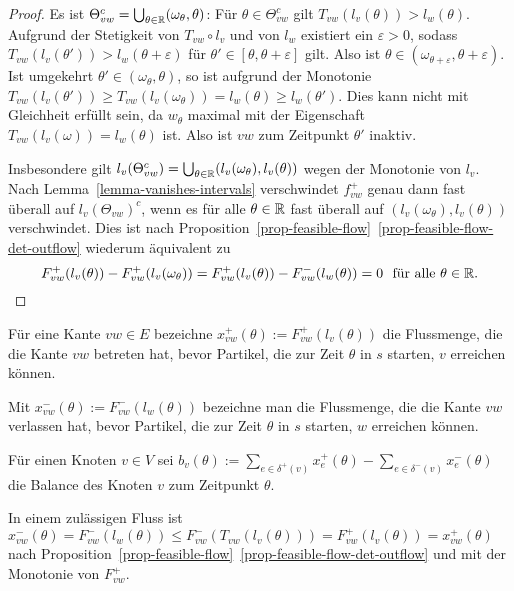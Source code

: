 \begin{proof}
	Es ist $\Theta_{vw}^c = \bigcup_{\theta\in\mathbb{R}} (\omega_\theta, \theta)$:
	Für $\theta\in\Theta_{vw}^c$ gilt $T_{vw}(l_v(\theta)) > l_w(\theta)$.
	Aufgrund der Stetigkeit von $T_{vw}\circ l_v$ und von $l_w$ existiert ein $\varepsilon>0$, sodass $T_{vw}(l_v(\theta')) > l_w(\theta+\varepsilon)$ für $\theta'\in[\theta,\theta+\varepsilon]$ gilt.
	Also ist $\theta\in(\omega_{\theta+\varepsilon}, \theta+\varepsilon)$.
	Ist umgekehrt $\theta'\in (\omega_\theta,\theta)$, so ist aufgrund der Monotonie $T_{vw}(l_v(\theta'))\geq T_{vw}(l_v(\omega_\theta)) = l_w(\theta)\geq l_w(\theta')$.
	Dies kann nicht mit Gleichheit erfüllt sein, da $w_\theta$ maximal mit der Eigenschaft $T_{vw}(l_v(\omega)) = l_w(\theta)$ ist.
	Also ist $vw$ zum Zeitpunkt $\theta'$ inaktiv.
	
	Insbesondere gilt $l_v(\Theta_{vw}^c) = \bigcup_{\theta\in\mathbb{R}}(l_v(\omega_\theta),l_v(\theta))$ wegen der Monotonie von $l_v$.
	Nach Lemma~\ref{lemma-vanishes-intervals} verschwindet $f_{vw}^+$ genau dann fast überall auf $l_v(\Theta_{vw})^c$, wenn es für alle $\theta\in\mathbb{R}$ fast überall auf $(l_v(\omega_\theta),l_v(\theta))$ verschwindet.
	Dies ist nach Proposition~\ref{prop-feasible-flow}~\ref{prop-feasible-flow-det-outflow} wiederum äquivalent zu
	$$F_{vw}^+(l_v(\theta))-F_{vw}^+(l_v(\omega_\theta)) = F_{vw}^+(l_v(\theta))-F_{vw}^-(l_w(\theta))=0~~\text{für alle $\theta\in\mathbb{R}$}.$$
	\vspace{-2.8 \baselineskip}
	
\end{proof}

\begin{definition}
	Für eine Kante $vw\in E$ bezeichne $x_{vw}^+(\theta):= F_{vw}^+(l_v(\theta))$ die Flussmenge, die die Kante $vw$ betreten hat, bevor Partikel, die zur Zeit $\theta$ in $s$ starten, $v$ erreichen können.
	
	Mit $x_{vw}^-(\theta):= F^-_{vw}(l_w(\theta))$ bezeichne man die Flussmenge, die die Kante $vw$ verlassen hat, bevor Partikel, die zur Zeit $\theta$ in $s$ starten, $w$ erreichen können.
	
	Für einen Knoten $v\in V$ sei $b_v(\theta):=\sum_{e\in\delta^+(v)} x_e^+(\theta) - \sum_{e\in\delta^-(v)} x_e^-(\theta)$ die Balance des Knoten $v$ zum Zeitpunkt $\theta$.
\end{definition}


\begin{remark}\label{remark-x^-leqx^+}
	In einem zulässigen Fluss ist $x_{vw}^-(\theta) = F_{vw}^-(l_w(\theta)) \leq F_{vw}^-(T_{vw}(l_v(\theta)))=F_{vw}^+(l_v(\theta)) = x_{vw}^+(\theta)$
	 nach Proposition~\ref{prop-feasible-flow}~\ref{prop-feasible-flow-det-outflow} und mit der Monotonie von $F_{vw}^+$.
\end{remark}

